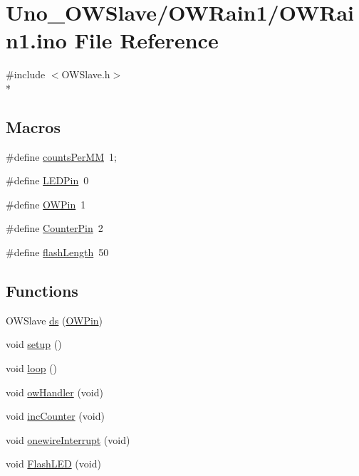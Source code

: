 \hypertarget{OWRain1_8ino}{\section{Uno\-\_\-\-O\-W\-Slave/\-O\-W\-Rain1/\-O\-W\-Rain1.ino File Reference}
\label{OWRain1_8ino}
}
{\ttfamily \#include $<$O\-W\-Slave.\-h$>$}\\*
\subsection*{Macros}
\begin{DoxyCompactItemize}
\item 
\#define \hyperlink{OWRain1_8ino_a8f0a461ec2c621e04db91f4970f2f1d5}{counts\-Per\-M\-M}~1;
\item 
\#define \hyperlink{OWRain1_8ino_abd966e26c1237652c6c1dc46a8f14203}{L\-E\-D\-Pin}~0
\item 
\#define \hyperlink{OWRain1_8ino_a7f5aa1ac0711ae18877a165a9bf24625}{O\-W\-Pin}~1
\item 
\#define \hyperlink{OWRain1_8ino_abc1e3c6ffa5733cf9f5f428b3d724765}{Counter\-Pin}~2
\item 
\#define \hyperlink{OWRain1_8ino_a65b6f41e12d2d8bdbd3416c8db11770e}{flash\-Length}~50
\end{DoxyCompactItemize}
\subsection*{Functions}
\begin{DoxyCompactItemize}
\item 
O\-W\-Slave \hyperlink{OWRain1_8ino_af75456870b9486275b406e13b003fb11}{ds} (\hyperlink{OWRain1_8ino_a7f5aa1ac0711ae18877a165a9bf24625}{O\-W\-Pin})
\item 
void \hyperlink{OWRain1_8ino_a4fc01d736fe50cf5b977f755b675f11d}{setup} ()
\item 
void \hyperlink{OWRain1_8ino_afe461d27b9c48d5921c00d521181f12f}{loop} ()
\item 
void \hyperlink{OWRain1_8ino_a643d85ad86e66d0d2e01c6221fc1ed68}{ow\-Handler} (void)
\item 
void \hyperlink{OWRain1_8ino_a61b57f49f8a3d9c3efad2e8c22401e89}{inc\-Counter} (void)
\item 
void \hyperlink{OWRain1_8ino_a88a9a9fb27383ed7c6a52946a7b7e9a6}{onewire\-Interrupt} (void)
\item 
void \hyperlink{OWRain1_8ino_a01a172314339d22fc02b43fb765e0d76}{Flash\-L\-E\-D} (void)
\end{DoxyCompactItemize}
